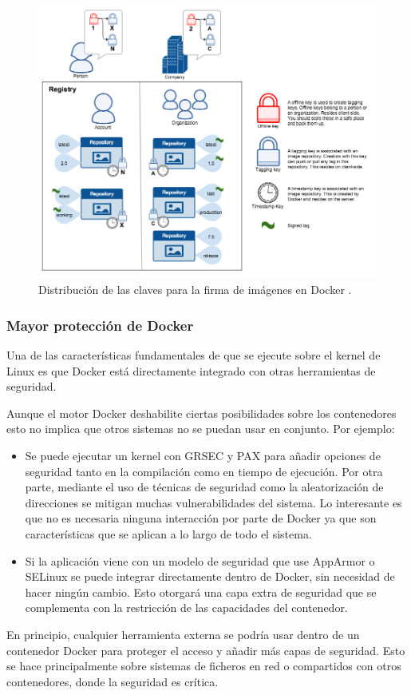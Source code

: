 \begin{figure}[H]
  \centering
  \includegraphics[width=\linewidth]{pictures/trust_components.png}
  \caption{Distribución de las claves para la firma de imágenes en Docker \autocite{ContentTrustDocker2021}.}
  \label{fig:keys}
\end{figure}

\subsubsection*{Mayor protección de Docker}
Una de las características fundamentales de que se ejecute sobre el kernel de Linux
es que Docker está directamente integrado con otras herramientas de seguridad.

Aunque el motor Docker deshabilite ciertas posibilidades sobre los contenedores
esto no implica que otros sistemas no se puedan usar en conjunto. Por ejemplo:

\begin{itemize}
  \item Se puede ejecutar un kernel con GRSEC \autocite{Grsecurity} y PAX \autocite{PaX2019}
        para añadir opciones de seguridad tanto en la compilación como en tiempo
        de ejecución. Por otra parte, mediante el uso de técnicas de seguridad como
        la aleatorización de direcciones se mitigan muchas vulnerabilidades
        del sistema. Lo interesante es que no es necesaria ninguna interacción
        por parte de Docker ya que son características que se aplican a lo largo
        de todo el sistema.
  \item Si la aplicación viene con un modelo de seguridad que use AppArmor o SELinux
        se puede integrar directamente dentro de Docker, sin necesidad de hacer
        ningún cambio. Esto otorgará una capa extra de seguridad que se complementa
        con la restricción de las capacidades del contenedor.
\end{itemize}

En principio, cualquier herramienta externa se podría usar dentro de un contenedor
Docker para proteger el acceso y añadir más capas de seguridad. Esto se hace
principalmente sobre sistemas de ficheros en red o compartidos con otros
contenedores, donde la seguridad es crítica.